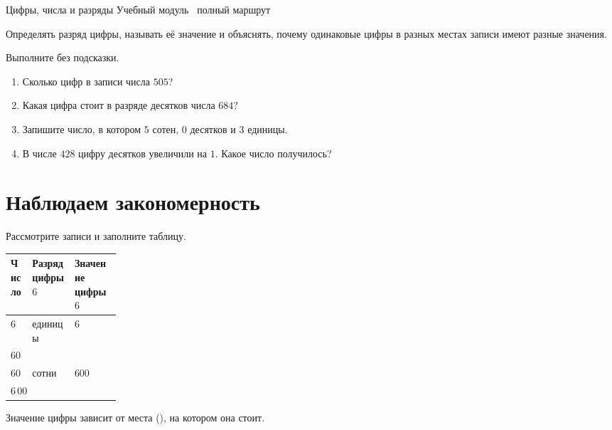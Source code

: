 \worksheettitle
  {Цифры, числа и разряды}
  { Учебный модуль \textbullet\ полный маршрут}

\studentnameblock

\begin{notebox}
  Определять разряд цифры, называть её значение и объяснять, почему одинаковые
  цифры в разных местах записи имеют разные значения.
\end{notebox}

\begin{checkpointbox}
  Выполните без подсказки.
  \begin{enumerate}[label=\textbf{\arabic*.}]
    \item Сколько цифр в записи числа \(505\)? \answerblank[16mm]
    \item Какая цифра стоит в разряде десятков числа \(684\)?
      \answerblank[16mm]
    \item Запишите число, в котором \(5\) сотен, \(0\) десятков и \(3\) единицы. \answerblank[16mm]
    \item В числе \(428\) цифру десятков увеличили на \(1\). Какое число получилось?  \answerblank[16mm]
  \end{enumerate}
\end{checkpointbox}
\vspace{-1.5em}
\section{Наблюдаем закономерность}

Рассмотрите записи и заполните таблицу.

\begin{center}
\renewcommand{\arraystretch}{1.45}
\begin{tabularx}{0.94\linewidth}{@{}>{\centering\arraybackslash}p{0.18\linewidth}>{\centering\arraybackslash}X>{\centering\arraybackslash}X@{}}
  \toprule
  \rowcolor{TableHeader}
  Число & Разряд цифры \(6\) & Значение цифры \(6\) \\
  \midrule
  \(6\) & единицы & \(6\) \\
  \(60\) & & \\
  \(600\) & сотни & \(600\) \\
  \(6\,000\) & & \\
  \bottomrule
\end{tabularx}
\end{center}

\begin{reflectionbox}
  Значение цифры зависит от места (\answerblank[32mm]), на котором она стоит.
\end{reflectionbox}



